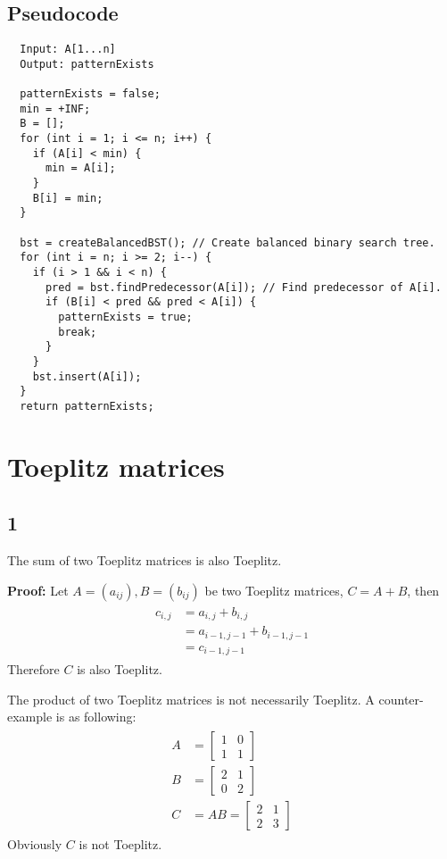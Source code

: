 \documentclass[paper=a4, fontsize=11pt]{scrartcl} %
\numberwithin{equation}{section} %
\numberwithin{figure}{section} %
\numberwithin{table}{section} %
\numberwithin{claimcounter}{section}
\begin{document}
\subsection*{Pseudocode}
\begin{verbatim}
  Input: A[1...n]
  Output: patternExists
  
  patternExists = false;
  min = +INF;
  B = [];
  for (int i = 1; i <= n; i++) {
    if (A[i] < min) {
      min = A[i];
    }
    B[i] = min;
  }
  
  bst = createBalancedBST(); // Create balanced binary search tree.
  for (int i = n; i >= 2; i--) {
    if (i > 1 && i < n) {
      pred = bst.findPredecessor(A[i]); // Find predecessor of A[i].
      if (B[i] < pred && pred < A[i]) {
        patternExists = true;
        break;
      }
    }
    bst.insert(A[i]);
  }
  return patternExists;
\end{verbatim}

\section{Toeplitz matrices}
\subsection*{1}
The sum of two Toeplitz matrices is also Toeplitz.

\textbf{Proof:}
Let $A = (a_{ij}), B = (b_{ij})$ be two Toeplitz matrices, $C = A + B$, then
\begin{align}
  \begin{split}
    c_{i,j} &= a_{i,j} + b_{i,j} \\
           &= a_{i-1,j-1} + b_{i-1,j-1} \\
           &= c_{i-1,j-1} 
  \end{split}
\end{align}
Therefore $C$ is also Toeplitz.

The product of two Toeplitz matrices is not necessarily Toeplitz. A
counter-example is as following:
\begin{align}
  \begin{split}
    A &= \begin{bmatrix}
      1 & 0 \\
      1 & 1 
    \end{bmatrix} \\
    B &= \begin{bmatrix}
      2 & 1 \\
      0 & 2 
    \end{bmatrix} \\
    C &= AB = \begin{bmatrix}
      2 & 1 \\
      2 & 3 
    \end{bmatrix}
  \end{split}
\end{align}
Obviously $C$ is not Toeplitz.
\end{document}
